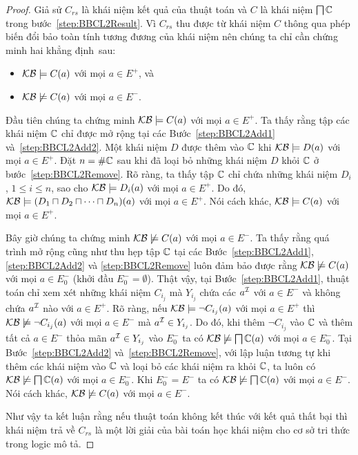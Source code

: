 \begin{proof}
	Giả sử $C_{rs}$ là khái niệm kết quả của thuật toán \BBCLearnS và $C$ là khái niệm $\bigsqcap\mathbb{C}$ trong bước~\ref{step:BBCL2Result}. Vì $C_{rs}$ thu được từ khái niệm $C$ thông qua phép biến đổi bảo toàn tính tương đương của khái niệm nên chúng ta chỉ cần chứng minh hai khẳng định~sau:
	\begin{itemize}
		\item $\mathcal{KB} \models C(a)$ với mọi $a \in E^+$, và
		\item $\mathcal{KB} \not\models C(a)$ với mọi $a \in E^-$.
	\end{itemize}
	
	Đầu tiên chúng ta chứng minh $\mathcal{KB} \models C(a)$ với mọi $a \in E^+$. Ta thấy rằng tập các khái niệm $\mathbb{C}$ chỉ được mở rộng tại các Bước~\ref{step:BBCL2Add1} và~\ref{step:BBCL2Add2}. Một khái niệm $D$ được thêm vào $\mathbb{C}$ khi $\mathcal{KB} \models D(a)$ với mọi $a \in E^+$. Đặt $n = \#\mathbb{C}$ sau khi đã loại bỏ những khái niệm $D$ khỏi $\mathbb{C}$ ở bước~\ref{step:BBCL2Remove}. Rõ ràng, ta thấy tập $\mathbb{C}$ chỉ chứa những khái niệm $D_i$, $1 \leq i \leq n$, sao cho $\mathcal{KB} \models D_i(a)$ với mọi $a \in E^+$. Do đó, $\mathcal{KB} \models (D_1 \sqcap D_2 \sqcap \cdots \sqcap D_n)(a)$ với mọi $a \in E^+$. 
	Nói cách khác, $\mathcal{KB} \models C(a)$ với mọi $a \in E^+$.
	
	Bây giờ chúng ta chứng minh $\mathcal{KB} \not\models C(a)$ với mọi $a \in E^-$. Ta thấy rằng quá trình mở rộng cũng như thu hẹp tập $\mathbb{C}$ tại các Bước~\ref{step:BBCL2Add1}, \ref{step:BBCL2Add2} và \ref{step:BBCL2Remove} luôn đảm bảo được rằng $\mathcal{KB} \not\models C(a)$ với mọi $a \in E^-_0$ (khởi đầu $E^-_0 = \emptyset$). Thật vậy, tại Bước~\ref{step:BBCL2Add1}, thuật toán chỉ xem xét những khái niệm $C_{i_j}$ mà $Y_{i_j}$ chứa các $a^{\mathcal{I}}$ với $a \in E^-$ và không chứa $a^{\mathcal{I}}$ nào với $a \in E^+$. Rõ ràng, nếu $\mathcal{KB} \models \neg C_{i_j}(a)$ với mọi $a \in E^+$ thì $\mathcal{KB} \not\models \neg C_{i_j}(a)$ với mọi $a \in E^-$ mà $a^{\mathcal{I}} \in Y_{i_j}$. Do đó, khi thêm $\neg C_{i_j}$ vào $\mathbb{C}$ và thêm tất cả $a \in E^-$ thỏa mãn $a^{\mathcal{I}} \in Y_{i_j}$ vào $E^-_0$ ta có $\mathcal{KB} \not\models \bigsqcap\mathbb{C}(a)$ với mọi $a \in E^-_0$. Tại Bước~\ref{step:BBCL2Add2} và~\ref{step:BBCL2Remove}, với lập luận tương tự khi thêm các khái niệm vào $\mathbb{C}$ và loại bỏ các khái niệm ra khỏi $\mathbb{C}$, ta luôn có $\mathcal{KB} \not\models \bigsqcap\mathbb{C}(a)$ với mọi $a \in E^-_0$. Khi $E^-_0 = E^-$ ta có $\mathcal{KB} \not\models \bigsqcap\mathbb{C}(a)$ với mọi $a \in E^-$. Nói cách khác, $\mathcal{KB} \not\models C(a)$ với mọi $a \in E^-$.
	
	Như vậy ta kết luận rằng nếu thuật toán \BBCLearnS không kết thúc với kết quả thất bại thì khái niệm trả về $C_{rs}$ là một lời giải của bài toán học khái niệm cho cơ sở tri thức trong logic mô tả. 
\end{proof}

